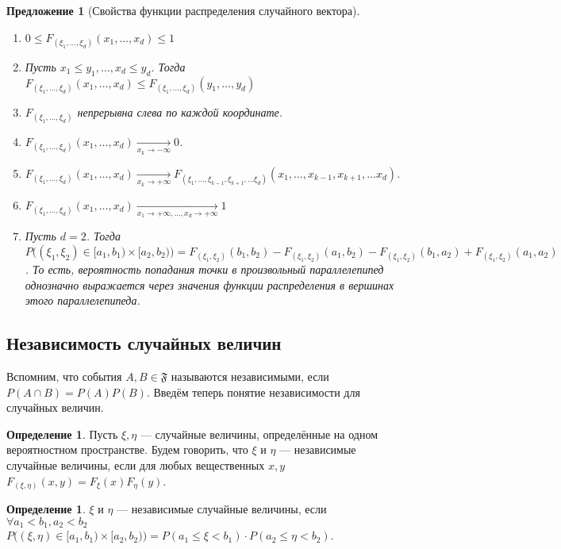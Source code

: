 \documentclass[11pt,openany,a4paper]{scrartcl}
\theoremstyle{plain}
\newtheorem{proposition}[theorem]{Предложение}
\theoremstyle{definition}
\newtheorem{definition}[theorem]{Определение}
\newcommand{\underto}[1]{\xrightarrow[#1]{}}
\begin{document}
\begin{proposition}[Свойства функции распределения случайного вектора]
\mbox{}
    \begin{enumerate}
        \item  $0 \leqslant F_{(\xi_1, \ldots, \xi_d)}(x_1, \ldots, x_d)
        \leqslant 1$
        \item Пусть $x_1 \leqslant y_1, \ldots, x_d \leqslant y_d$.
        Тогда $F_{(\xi_1, \ldots, \xi_d)}(x_1, \ldots, x_d) \leqslant
        F_{(\xi_1, \ldots, \xi_d)}(y_1, \ldots, y_d)$
        \item $F_{(\xi_1, \ldots, \xi_d)}$ непрерывна слева по каждой координате.
        \item $F_{(\xi_1, \ldots, \xi_d)}(x_1, \ldots, x_d)
        \underto{x_k \to -\infty} 0$.
        \item $F_{(\xi_1, \ldots, \xi_d)}(x_1, \ldots, x_d)
        \underto{x_k \to +\infty}
        F_{(\xi_1, \ldots, \xi_{k-1}, \xi_{k+1}, \ldots \xi_d)}
        (x_1, \ldots, x_{k-1}, x_{k+1}, \ldots x_d)$.
        \item $F_{(\xi_1, \ldots, \xi_d)}(x_1, \ldots, x_d)
        \underto{x_1 \to +\infty, \ldots, x_d \to +\infty} 1$
        \item Пусть $d = 2$. Тогда
        $P\big((\xi_1, \xi_2) \in [a_1, b_1) \times [a_2, b_2)\big) =
        F_{(\xi_1, \xi_2)}(b_1, b_2) - F_{(\xi_1, \xi_2)}(a_1, b_2) -
        F_{(\xi_1, \xi_2)}(b_1, a_2) + F_{(\xi_1, \xi_2)}(a_1, a_2)$. То есть, 
        вероятность попадания точки в произвольный параллелепипед
        однозначно выражается 
        через значения функции распределения в вершинах этого параллелепипеда.
    \end{enumerate}
\end{proposition}

\subsection{Независимость случайных величин}

Вспомним, что события $A, B \in \mathfrak F$ называются независимыми, если
$P(A \cap B) = P(A)P(B)$. Введём теперь понятие независимости для случайных
величин.

\begin{definition}\label{random_var_independence1}
    Пусть $\xi, \eta$ — случайные величины, определённые на одном вероятностном
    пространстве. Будем говорить, что $\xi$ и $\eta$ — независимые случайные 
    величины, если для любых вещественных $x, y$
    $F_{(\xi, \eta)}(x, y) = F_\xi(x)F_\eta(y)$.
\end{definition}
\begin{definition}\label{random_var_independence2}
    $\xi$ и $\eta$ — независимые случайные величины, если
    $\forall a_1 < b_1, a_2 < b_2$ $P\big((\xi, \eta) \in [a_1, b_1) \times
    [a_2, b_2)\big) = P(a_1 \leqslant \xi < b_1) \cdot P(a_2 \leqslant
    \eta < b_2)$.
\end{definition}
\end{document}
